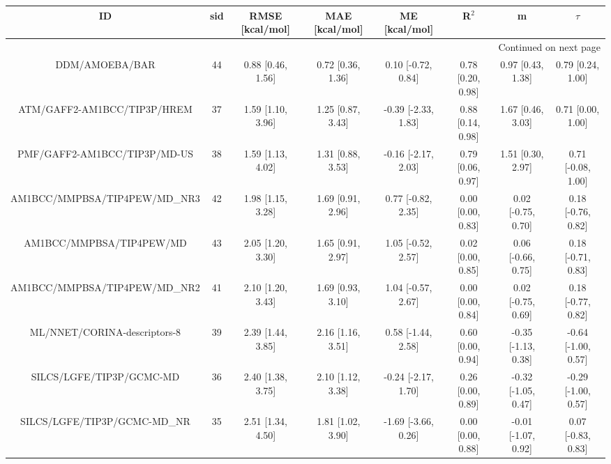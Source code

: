 \documentclass[8pt]{article}
\begin{document}
\begin{center}
\begin{footnotesize}
\begin{longtable}{|cccccccc|}
\toprule
                                   ID & sid &     RMSE [kcal/mol] &      MAE [kcal/mol] &         ME [kcal/mol] &              R$^2$ &                    m &               $\tau$ \\
\midrule
\endhead
\midrule
\multicolumn{8}{r}{{Continued on next page}} \\
\midrule
\endfoot

\bottomrule
\endlastfoot
                       DDM/AMOEBA/BAR &  44 &   0.88 [0.46, 1.56] &   0.72 [0.36, 1.36] &    0.10 [-0.72, 0.84] &  0.78 [0.20, 0.98] &    0.97 [0.43, 1.38] &    0.79 [0.24, 1.00] \\
          ATM/GAFF2-AM1BCC/TIP3P/HREM &  37 &   1.59 [1.10, 3.96] &   1.25 [0.87, 3.43] &   -0.39 [-2.33, 1.83] &  0.88 [0.14, 0.98] &    1.67 [0.46, 3.03] &    0.71 [0.00, 1.00] \\
         PMF/GAFF2-AM1BCC/TIP3P/MD-US &  38 &   1.59 [1.13, 4.02] &   1.31 [0.88, 3.53] &   -0.16 [-2.17, 2.03] &  0.79 [0.06, 0.97] &    1.51 [0.30, 2.97] &   0.71 [-0.08, 1.00] \\
        AM1BCC/MMPBSA/TIP4PEW/MD\_NR3 &  42 &   1.98 [1.15, 3.28] &   1.69 [0.91, 2.96] &    0.77 [-0.82, 2.35] &  0.00 [0.00, 0.83] &   0.02 [-0.75, 0.70] &   0.18 [-0.76, 0.82] \\
             AM1BCC/MMPBSA/TIP4PEW/MD &  43 &   2.05 [1.20, 3.30] &   1.65 [0.91, 2.97] &    1.05 [-0.52, 2.57] &  0.02 [0.00, 0.85] &   0.06 [-0.66, 0.75] &   0.18 [-0.71, 0.83] \\
        AM1BCC/MMPBSA/TIP4PEW/MD\_NR2 &  41 &   2.10 [1.20, 3.43] &   1.69 [0.93, 3.10] &    1.04 [-0.57, 2.67] &  0.00 [0.00, 0.84] &   0.02 [-0.75, 0.69] &   0.18 [-0.77, 0.82] \\
         ML/NNET/CORINA-descriptors-8 &  39 &   2.39 [1.44, 3.85] &   2.16 [1.16, 3.51] &    0.58 [-1.44, 2.58] &  0.60 [0.00, 0.94] &  -0.35 [-1.13, 0.38] &  -0.64 [-1.00, 0.57] \\
             SILCS/LGFE/TIP3P/GCMC-MD &  36 &   2.40 [1.38, 3.75] &   2.10 [1.12, 3.38] &   -0.24 [-2.17, 1.70] &  0.26 [0.00, 0.89] &  -0.32 [-1.05, 0.47] &  -0.29 [-1.00, 0.57] \\
         SILCS/LGFE/TIP3P/GCMC-MD\_NR &  35 &   2.51 [1.34, 4.50] &   1.81 [1.02, 3.90] &   -1.69 [-3.66, 0.26] &  0.00 [0.00, 0.88] &  -0.01 [-1.07, 0.92] &   0.07 [-0.83, 0.83] \\

\end{longtable}
\end{footnotesize}
\end{center}
\end{document}

